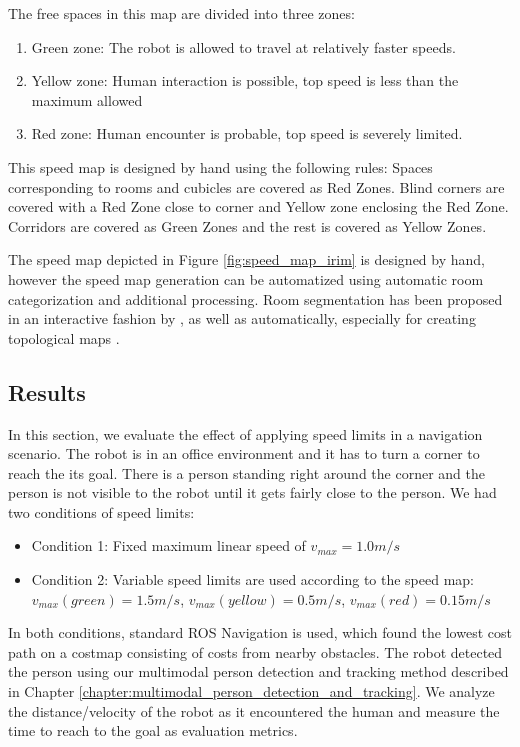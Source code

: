 The free spaces in this map are divided into three zones:
\begin{enumerate}
\item Green zone: The robot is allowed to travel at relatively faster speeds.
\item Yellow zone: Human interaction is possible, top speed is less than the maximum allowed
\item Red zone: Human encounter is probable, top speed is severely limited.
\end{enumerate}

This speed map is designed by hand using the following rules: Spaces corresponding to rooms and cubicles are covered as Red Zones. Blind corners are covered with a Red Zone close to corner and Yellow zone enclosing the Red Zone. Corridors are covered as Green Zones and the rest is covered as Yellow Zones. 

The speed map depicted in Figure \ref{fig:speed_map_irim} is designed by hand, however the speed map generation can be automatized using automatic room categorization and additional processing. Room segmentation has been proposed in an interactive fashion by \cite{diosi2005interactive}, as well as automatically, especially for creating topological maps \cite{mozos2007supervised}.

\subsection{Results}
\label{sec:navigation_speed_maps_results}

In this section, we evaluate the effect of applying speed limits in a navigation scenario. The robot is in an office environment and it has to turn a corner to reach the its goal. There is a person standing right around the corner and the person is not visible to the robot until it gets fairly close to the person. We had two conditions of speed limits:

\begin{itemize}
\item Condition 1: Fixed maximum linear speed of $v_{max}=1.0m/s$
\item Condition 2: Variable speed limits are used according to the speed map: $v_{max}(green)=1.5m/s$, $v_{max}(yellow)=0.5m/s$, $v_{max}(red)=0.15m/s$
\end{itemize}

In both conditions, standard ROS Navigation is used, which found the lowest cost path on a costmap consisting of costs from nearby obstacles. The robot detected the person using our multimodal person detection and tracking method described in Chapter \ref{chapter:multimodal_person_detection_and_tracking}. We analyze the distance/velocity of the robot as it encountered the human and measure the time to reach to the goal as evaluation metrics.

